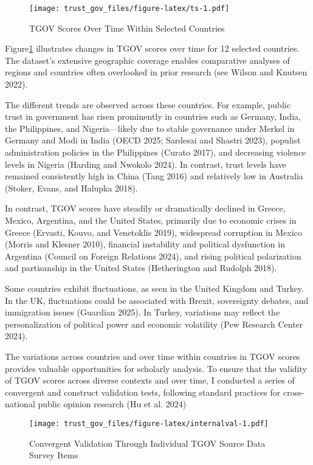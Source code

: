 \documentclass[
  12pt,
]{article}
\begin{document}
\begin{figure}
\centering
\texttt{[image: trust\_gov\_files/figure-latex/ts-1.pdf]}
\caption{\label{fig:ts}TGOV Scores Over Time Within Selected Countries \label{ts_plots}}
\end{figure}

Figure\nobreakspace{}\ref{ts_plots} illustrates changes in TGOV scores over time for 12 selected countries.
The dataset's extensive geographic coverage enables comparative analyses of regions and countries often overlooked in prior research (see Wilson and Knutsen 2022).

The different trends are observed across these countries.
For example, public trust in government has risen prominently in countries such as Germany, India, the Philippines, and Nigeria---likely due to stable governance under Merkel in Germany and Modi in India (OECD 2025; Sardesai and Shastri 2023), populist administration policies in the Philippines (Curato 2017), and decreasing violence levels in Nigeria (Harding and Nwokolo 2024).
In contrast, trust levels have remained consistently high in China (Tang 2016) and relatively low in Australia (Stoker, Evans, and Halupka 2018).

In contrast, TGOV scores have steadily or dramatically declined in Greece, Mexico, Argentina, and the United States, primarily due to economic crises in Greece (Ervasti, Kouvo, and Venetoklis 2019), widespread corruption in Mexico (Morris and Klesner 2010), financial instability and political dysfunction in Argentina (Council on Foreign Relations 2024), and rising political polarization and partisanship in the United States (Hetherington and Rudolph 2018).

Some countries exhibit fluctuations, as seen in the United Kingdom and Turkey.
In the UK, fluctuations could be associated with Brexit, sovereignty debates, and immigration issues (Guardian 2025).
In Turkey, variations may reflect the personalization of political power and economic volatility (Pew Research Center 2024).

The variations across countries and over time within countries in TGOV scores provides valuable opportunities for scholarly analysis.
To ensure that the validity of TGOV scores across diverse contexts and over time, I conducted a series of convergent and construct validation tests, following standard practices for cross-national public opinion research (Hu et al. 2024)

\begin{figure}
\centering
\texttt{[image: trust\_gov\_files/figure-latex/internalval-1.pdf]}
\caption{\label{fig:internalval}Convergent Validation Through Individual TGOV Source Data Survey Items \label{inter_val}}
\end{figure}
\end{document}
